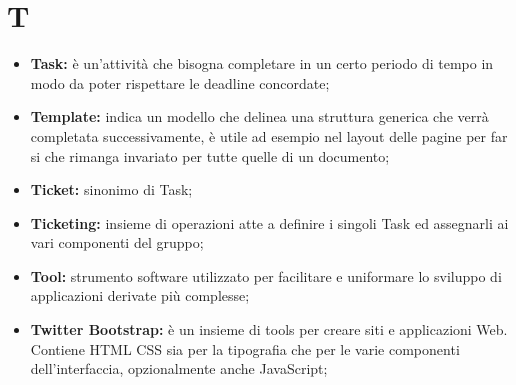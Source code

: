 \section*{\Huge T} %
\label{sec:t}
	\begin{itemize}
		\item \textbf{Task:} è un'attività che bisogna completare in un certo periodo di tempo in modo da poter rispettare le deadline concordate;
		\item \textbf{Template:} indica un modello che delinea una struttura generica che verrà completata successivamente, è utile ad esempio nel layout delle pagine per far si che rimanga invariato per tutte quelle di un documento;
		\item \textbf{Ticket:} sinonimo di Task;
		\item \textbf{Ticketing:} insieme di operazioni atte a definire i singoli Task ed assegnarli ai vari componenti del gruppo;
		\item \textbf{Tool:} strumento software utilizzato per facilitare e uniformare lo sviluppo di applicazioni derivate più complesse;
		\item \textbf{Twitter Bootstrap:} è un insieme di tools per creare siti e applicazioni Web. Contiene HTML CSS sia per la tipografia che per le varie componenti dell'interfaccia, opzionalmente anche JavaScript;
		
	\end{itemize}
\pagebreak
